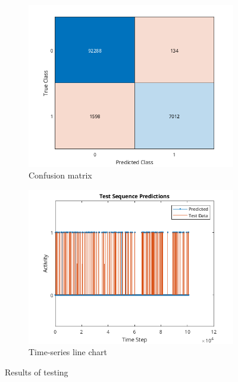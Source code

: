\documentclass[12pt,a4paper,titlepage,openany]{report}
\begin{document}
\begin{figure}
    \begin{subfigure}{0.5\linewidth}
    \includegraphics[width=1\linewidth]{./new_training/training_test_data_confusion_chart_new.png}
    \caption{Confusion matrix}
    \end{subfigure}
    \begin{subfigure}{0.5\linewidth}
    \includegraphics[width=1\linewidth]{./new_training/test_sequence_predictions_new.png}
    \caption{Time-series line chart}
    \end{subfigure}
    \caption{Results of testing}
\end{figure}
\end{document}
